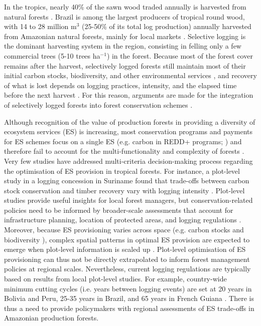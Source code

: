 \documentclass{article}
\begin{document}
In the tropics, nearly 40\% of the sawn wood traded annually is harvested from natural forests \cite{Payn2015}. Brazil is among the largest producers of tropical round wood, with 14 to 28 million m$^3$ (25-50\% of its total log production) annually harvested from Amazonian natural forests, mainly for local markets \cite{SFB2010,Santos2013,FAOstat2018}. Selective logging is the dominant harvesting system in the region, consisting in felling only a few commercial trees (5-10 trees ha$^{-1}$) in the forest. Because most of the forest cover remains after the harvest, selectively logged forests still maintain most of their initial carbon stocks, biodiversity, and other environmental services \cite{Putz2012}, and recovery of what is lost depends on logging practices, intensity, and the elapsed time before the next harvest \cite{Rutishauser2015,Piponiot2018}. For this reason, arguments are made for the integration of selectively logged forests into forest conservation schemes \cite{Edwards2014a}.  

Although recognition of the value of production forests in providing a diversity of ecosystem services (ES) is increasing, most conservation programs and payments for ES schemes focus on a single ES (e.g. carbon in REDD+ programs; \cite{Laing2016}) and therefore fail to account for the multi-functionality and complexity of forests \cite{VanderPlas2017}. Very few studies have addressed multi-criteria decision-making process regarding the optimisation of ES provision in tropical forests. For instance, a plot-level study in a logging concession in Suriname found that trade-offs between carbon stock conservation and timber recovery vary with logging intensity \cite{Roopsind2018}. Plot-level studies provide useful insights for local forest managers, but conservation-related policies need to be informed by broader-scale assessments that account for infrastructure planning, location of protected areas, and logging regulations \cite{Hein2006b}. Moreover, because ES provisioning varies across space (e.g. carbon stocks \cite{Avitabile2016} and biodiversity \cite{Jenkins2013}), complex spatial patterns in optimal ES provision are expected to emerge when plot-level information is scaled up \cite{Gibson2000}. Plot-level optimisation of ES provisioning can thus not be directly extrapolated to inform forest management policies at regional scales. Nevertheless, current logging regulations are typically based on results from local plot-level studies. For example, country-wide minimum cutting cycles (i.e. years between logging events) are set at 20 years in Bolivia and Peru, 25-35 years in Brazil, and 65 years in French Guiana \cite{Blaser2011}. There is thus a need to provide policymakers with regional assessments of ES trade-offs in Amazonian production forests.  
\end{document}
